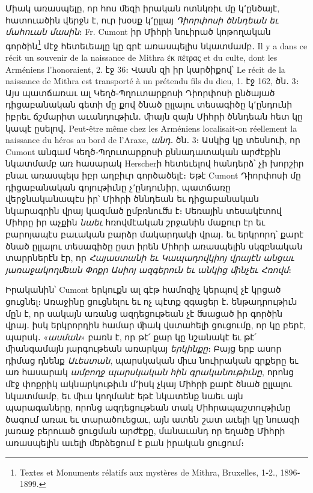 \documentclass{article}
\begin{document}
{Միակ առասպելը, որ հոս ﬔզի իրական ոտնկռիւ մը կ՚ընծայէ, հատուածին վերջն է, ուր խօսք կ՚ըլլայ \emph{Դիորփոսի ծննդեան եւ մահուան մասին}։ Fr. Cumont իր Միհրի նուիրած կոթողական գործին\footnote{Textes et Monuments rélatifs aux mystères de Mithra, Bruxelles, 1֊2., 1896֊1899.} մէջ հետեւեալը կը գրէ առասպելիս նկատմամբ․ Il y a dans ce récit un souvenir de la naissance de Mithra ἐκ πέτρας et du culte, dont les Arméniens l'honoraient, 2. էջ 36։ Վասն զի իր կարծիքով՝ Le récit de la naissance de Mithra est transporté à un prétendu fils du dieu, 1. էջ 162, ծն․ 3։ Այս պատճառաւ ալ Կեղծ֊Պղուտարքոսի Դիորփոսի ընծայած դիցաբանական գետի մը քով ծնած ըլլալու տեսագիծը կ՚ընդունի իբրեւ ճշմարիտ աւանդութիւն․ ﬕայն զայն Միհրի ծննդեան հետ կը կապէ ըսելով․ Peut֊être même chez les Arméniens localisait֊on réellement la naissance du héros au bord de l'Araxe, \emph{անդ․} ծն․ 3։ Ասկից կը տեսնուի, որ Cumont անգամ Կեղծ֊Պղուտարքոսի քննադատական արժէքին նկատմամբ առ հասարակ Herscherի հետեւելով հանդերձ՝ չի խորշիր բնաւ առասպելս իբր աղբիւր գործածելէ։ Եթէ Cumont Դիորփոսի մը դիցաբանական գոյութիւնը չ՚ընդունիր, պատճառը վերջնականապէս իր՝ Միհրի ծննդեան եւ դիցաբանական նկարագրին վրայ կազմած ըմբռնուﬓ է։ Սեռային տեսակէտով Միհրը իր աչքին \emph{նաեւ} հռովմէական շրջանին մաքուր էր եւ բարոյապէս բաւական բարձր մակարդակի վրայ․ եւ երկրորդ՝ քարէ ծնած ըլլալու տեսագիծը ըստ իրեն Միհրի առասպելին սկզբնական տարրներէն էր, որ \emph{Հայաստանի եւ Կապադովկիոյ վրայէն անցաւ յառաջակողﬔան Փոքր Ասիոյ ազգերուն եւ անկից ﬕնչեւ Հռովմ}։

Իրականին՝ Cumont երկուքն ալ գէթ համոզիչ կերպով չէ կրցած ցուցնել։ Առաջինը ցուցնելու եւ ոչ պէտք զգացեր է․ ենթադրութիւն մըն է, որ սակայն առանց ազդեցութեան չէ ﬓացած իր գործին վրայ․ իսկ երկրորդին համար ﬕակ վստահելի ցուցումը, որ կը բերէ, պարսկ․ «\emph{ասման}» բառն է, որ թէ՛ քար կը նշանակէ եւ թէ՛ ﬕանգամայն յարգութեան առարկայ \emph{երկինքը}։ Բայց երբ ասոր դիմաց դնենք \emph{Աւեստան}, պարսկական ﬕւս նուիրական գրքերը եւ առ հասարակ \emph{ամբողջ պարսկական հին գրականութիւնը}, որոնց մէջ փոքրիկ ակնարկութիւն մ՚իսկ չկայ Միհրի քարէ ծնած ըլլալու նկատմամբ, եւ ﬕւս կողմանէ եթէ նկատենք նաեւ այն պարագաները, որոնց ազդեցութեան տակ Միհրապաշտութիւնը ծագում առաւ եւ տարածուեցաւ, այն ատեն շատ աւելի կը նուազի յառաջ բերուած ցուցման արժէքը, մանաւանդ որ եղածը Միհրի առասպելին աւելի ﬔրձեցում է քան իրական ցուցում։

}
\end{document}
